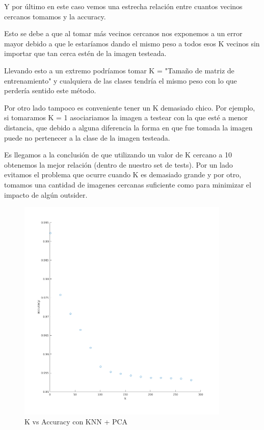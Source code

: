 Y por último en este caso vemos una estrecha relación entre cuantos vecinos cercanos tomamos y la accuracy.

Esto se debe a que al tomar más vecinos cercanos nos exponemos a un error mayor debido a que le estaríamos dando el mismo peso a todos esos K vecinos sin importar que tan cerca estén de la imagen testeada.

Llevando esto a un extremo podríamos tomar K = "Tamaño de matriz de entrenamiento" y cualquiera de las clases tendría el mismo peso con lo que perdería sentido este método.

Por otro lado tampoco es conveniente tener un K demasiado chico. Por ejemplo, si tomaramos K = 1 asociariamos la imagen a testear con la que esté a menor distancia, que debido a alguna diferencia la forma en que fue tomada la imagen puede no pertenecer a la clase de la imagen testeada.

Es llegamos a la conclusión de que utilizando un valor de K cercano a 10 obtenemos la mejor relación (dentro de nuestro set de tests).
Por un lado evitamos el problema que ocurre cuando K es demasiado grande y por otro, tomamos una cantidad de imagenes cercanas suficiente como para minimizar el impacto de algún outsider.
\begin{figure}[H]
	\centering
	\includegraphics[width=0.9\textwidth]{img/k_pca_accu.png}
	\caption{K vs Accuracy con KNN + PCA}
	\label{fig:K vs Accuracy con KNN + PCA}
\end{figure}


